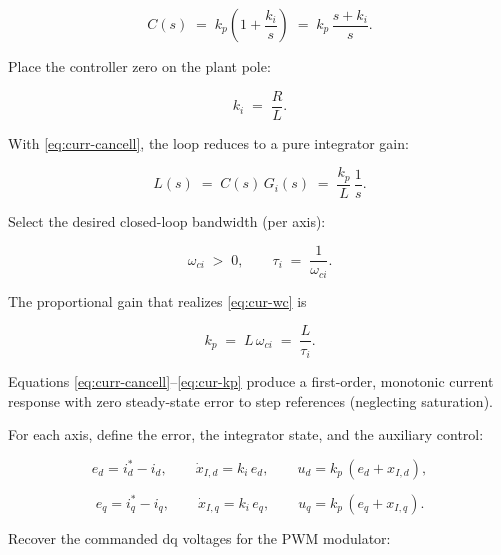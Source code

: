 \begin{equation}
	\label{eq:cur-C}
	C(s) \;=\; k_p \left( 1 + \frac{k_i}{s} \right) \;=\; k_p\,\frac{s + k_i}{s} .
\end{equation}

Place the controller zero on the plant pole:

\begin{equation}
	\label{eq:curr-cancell}
	k_i \;=\; \frac{R}{L} .
\end{equation}

With \eqref{eq:curr-cancell}, the loop reduces to a pure integrator gain:

\begin{equation}
	\label{eq:cur-loop}
	L(s) \;=\; C(s)\,G_i(s) \;=\; \frac{k_p}{L}\,\frac{1}{s} .
\end{equation}



Select the desired closed-loop bandwidth (per axis):

\begin{equation}
	\label{eq:cur-wc}
	\omega_{ci} \;>\; 0 , \qquad \tau_i \;=\; \frac{1}{\omega_{ci}} .
\end{equation}

The proportional gain that realizes \eqref{eq:cur-wc} is

\begin{equation}
	\label{eq:cur-kp}
	k_p \;=\; L\, \omega_{ci} \;=\; \frac{L}{\tau_i} .
\end{equation}

Equations \eqref{eq:curr-cancell}--\eqref{eq:cur-kp} produce a first-order, monotonic current response with zero steady-state error to step references (neglecting saturation).





For each axis, define the error, the integrator state, and the auxiliary control:

\begin{equation}
	\label{eq:cur-realize}
	e_d = i_d^{\ast} - i_d , \qquad \dot{x}_{I,d} = k_i\, e_d , \qquad u_d = k_p\,(e_d + x_{I,d}) ,
\end{equation}

\begin{equation}
	\label{eq:cur-realize-q}
	e_q = i_q^{\ast} - i_q , \qquad \dot{x}_{I,q} = k_i\, e_q , \qquad u_q = k_p\,(e_q + x_{I,q}) .
\end{equation}

Recover the commanded dq voltages for the PWM modulator:

